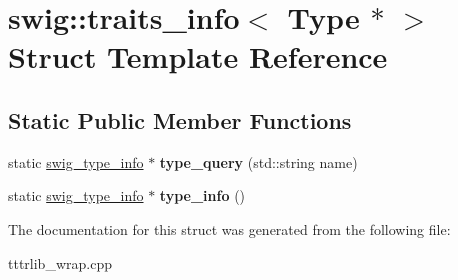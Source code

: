 \hypertarget{structswig_1_1traits__info_3_01_type_01_5_01_4}{}\section{swig\+:\+:traits\+\_\+info$<$ Type $\ast$ $>$ Struct Template Reference}
\label{structswig_1_1traits__info_3_01_type_01_5_01_4}
\subsection*{Static Public Member Functions}
\begin{DoxyCompactItemize}
\item 
\mbox{\label{structswig_1_1traits__info_3_01_type_01_5_01_4_a9ad7c24a351d4ff2ff4ce874221c1ded}} 
static \hyperlink{structswig__type__info}{swig\+\_\+type\+\_\+info} $\ast$ {\bfseries type\+\_\+query} (std\+::string name)
\item 
\mbox{\label{structswig_1_1traits__info_3_01_type_01_5_01_4_a61b96ed6c612d9a1daf04882a39675a3}} 
static \hyperlink{structswig__type__info}{swig\+\_\+type\+\_\+info} $\ast$ {\bfseries type\+\_\+info} ()
\end{DoxyCompactItemize}


The documentation for this struct was generated from the following file\+:\begin{DoxyCompactItemize}
\item 
tttrlib\+\_\+wrap.\+cpp\end{DoxyCompactItemize}
